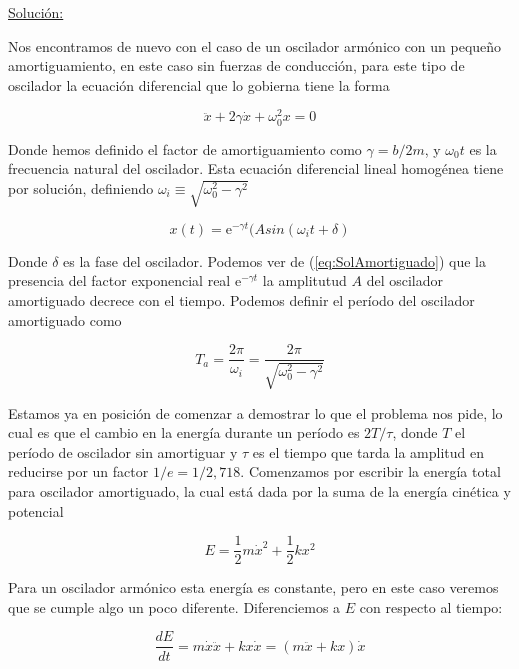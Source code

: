 \documentclass[a4paper,10pt]{article}
\numberwithin{equation}{section}
\newcommand{\euler}{\mathrm{e}}
\begin{document}
\underline{Solución:} \vspace{.3cm}

Nos encontramos de nuevo con el caso de un oscilador armónico con un pequeño amortiguamiento,
en este caso sin fuerzas de conducción, para este tipo de oscilador la ecuación diferencial
que lo gobierna tiene la forma 

\begin{equation}
 \ddot{x} + 2 \gamma \dot{x} + \omega_0^2 x = 0 
 \label{eq:ODEAmortiguado}
\end{equation}

Donde hemos definido el factor de amortiguamiento como $\gamma = b/2m$, y $\omega_0t$ 
es la frecuencia natural del oscilador. Esta ecuación diferencial lineal homogénea tiene
por solución, definiendo $\omega_i \equiv \sqrt{\omega_0^2 - \gamma^2}$

\begin{equation}
 x(t) = \euler^{-\gamma t} (A sin(\omega_i t + \delta)
 \label{eq:SolAmortiguado}
\end{equation}

Donde $\delta$ es la fase del oscilador. Podemos ver de (\ref{eq:SolAmortiguado}) que
la presencia del factor exponencial real $\euler^{-\gamma t}$ la amplitutud $A$ 
del oscilador amortiguado decrece con el tiempo. Podemos definir el período del oscilador
amortiguado como

\begin{equation}
 T_a = \frac{2\pi}{\omega_i} = \frac{2\pi}{\sqrt{\omega_0^2-\gamma^2}}
 \label{eq:PeriodoAmortiguado1}
\end{equation}

Estamos ya en posición de comenzar a demostrar lo que el problema nos pide, lo cual es
que el cambio en la energía durante un período es $2T/\tau$,
donde $T$ el período de oscilador sin amortiguar y $\tau$ es el tiempo
que tarda la amplitud en reducirse por un factor $1/e=1/2,718$. Comenzamos por 
escribir la energía total para oscilador amortiguado, la cual está dada por la suma
de la energía cinética y potencial

\begin{equation}
 E = \frac{1}{2} m \dot{x}^2 + \frac{1}{2} kx^2
 \label{eq:EnergiaAmorti1}
\end{equation}

Para un oscilador armónico esta energía es constante, pero en este caso veremos
que se cumple algo un poco diferente. Diferenciemos a $E$ con respecto al tiempo:

$$
\frac{dE}{dt} = m\dot{x}\ddot{x} + kx\dot{x} = (m\ddot{x}+kx)\dot{x}
$$
\end{document}
